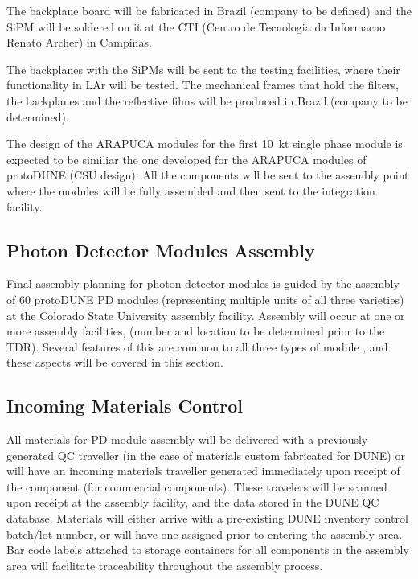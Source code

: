 The backplane board will be fabricated in Brazil (company to be defined) and the SiPM will be soldered on it at the CTI (Centro de Tecnologia da Informacao Renato Archer) in Campinas.  

The backplanes with the SiPMs will be sent to the testing facilities, where their functionality in LAr will be tested.   The mechanical frames that hold the filters, the backplanes and the reflective films will be produced in Brazil (company to be determined).   

The design of the ARAPUCA modules for the first 10~kt single phase module is expected to be similiar the one developed for the ARAPUCA modules of protoDUNE (CSU design).   All the components will be sent to the assembly point where the modules will be fully assembled and then sent to the integration facility.

\subsection{Photon Detector Modules Assembly}

Final assembly planning for photon detector modules is guided by the assembly of 60 protoDUNE PD modules (representing multiple units of all three varieties) at the Colorado State University assembly facility.  Assembly will occur at one or more assembly facilities, (number and location to be determined prior to the TDR).  Several features of this are common to all three types of module , and these aspects will be covered in this section.

\subsection{Incoming Materials Control}

All materials for PD module assembly will be delivered with a previously generated QC traveller (in the case of materials custom fabricated for DUNE) or will have an incoming materials traveller generated immediately upon receipt of the component (for commercial components).  These travelers will be scanned upon receipt at the assembly facility, and the data stored in the DUNE QC database.  Materials will either arrive with a pre-existing DUNE inventory control batch/lot number, or will have one assigned prior to entering the assembly area.  Bar code labels attached to storage containers for all components in the assembly area will facilitate traceability throughout the assembly process.

